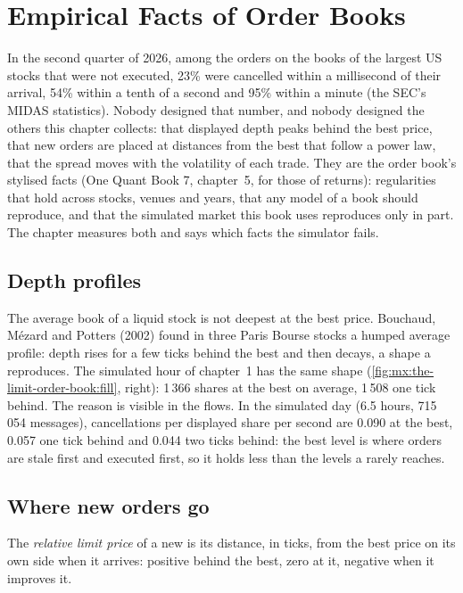 \chapter{Empirical Facts of Order Books}\label{ch:mx:empirical-facts-of-order-books}

In the second quarter of 2026, among the orders on the books of the largest US stocks that were not executed, 23\% were cancelled within a
millisecond of their arrival, 54\% within a tenth of a second and 95\% within a minute (the SEC's MIDAS statistics). Nobody designed that
number, and nobody designed the others this chapter collects: that displayed depth peaks behind the best price, that new orders are placed
at distances from the best that follow a power law, that the spread moves with the volatility of each trade. They are the order book's
stylised facts (One Quant Book 7, chapter~5, for those of returns): regularities that hold across stocks, venues and years, that any model of
a book should reproduce, and that the simulated market this book uses reproduces only in part. The chapter measures both and says which facts
the simulator fails.

\section{Depth profiles}

The average book of a liquid stock is not deepest at the best price. Bouchaud, Mézard and Potters (2002) found in three Paris Bourse stocks a
humped average profile: depth rises for a few ticks behind the best and then decays, a shape a  reproduces. The
simulated hour of chapter~1 has the same shape (\cref{fig:mx:the-limit-order-book:fill}, right): 1\,366 shares at the best on average, 1\,508 one
tick behind. The reason is visible in the flows. In the simulated day (6.5 hours, 715\,054 messages), cancellations per displayed share per second
are 0.090 at the best, 0.057 one tick behind and 0.044 two ticks behind: the best level is where orders are stale first and executed first, so it
holds less than the levels a  rarely reaches.

\section{Where new orders go}

\begin{definition}\label{def:mx:empirical-facts-of-order-books:relative}
The \emph{relative limit price} of a new  is its distance, in ticks, from the best price on its own side when
it arrives: positive behind the best, zero at it, negative when it improves it.
\end{definition}

